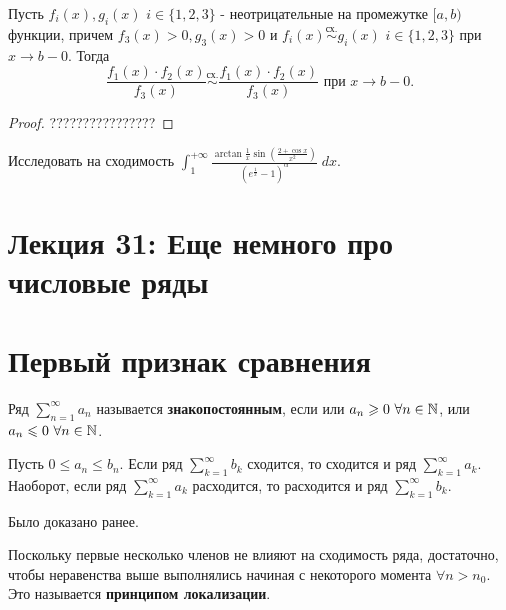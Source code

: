 	\begin{sentence}
		Пусть $f_i(x), g_i(x)$ $i \in \{1, 2, 3\}$ - неотрицательные на
		промежутке $[a, b)$ функции, причем $f_3(x) > 0, g_3(x) > 0$ и
		$f_i(x) \overset{\text{сх.}}{\sim} g_i(x)$ $i \in \{1, 2, 3\}$ при $x \rightarrow b - 0$. Тогда
		\[ \frac{f_1(x) \cdot f_2(x)}{f_3(x)} \overset{\text{сх.}}{\sim} \frac{f_1(x) \cdot f_2(x)}{f_3(x)} \text{ при } x \rightarrow b - 0.\]
	\end{sentence}
	
	\begin{proof}
		????????????????
	\end{proof}
	
	\begin{example}
		Исследовать на сходимость $\displaystyle \int_1^{+\infty} \frac{\arctan{\frac{1}{x}}\sin{(\frac{2 + \cos{x}}{x^2})}}{(e^{\frac{1}{x}} - 1)^{\alpha}} \; dx$.
	\end{example}
	
	\section*{Лекция 31: Еще немного про числовые ряды}

	\section{Первый признак сравнения}
	
	\begin{definition}
		Ряд $\sum_{n = 1}^{\infty} a_n$ называется \textbf{знакопостоянным}, если или
		$a_n \geqslant 0 \text{ } \forall n \in \mathbb N$, или $a_n \leqslant 0 \text{ } \forall n \in \mathbb N$.
	\end{definition}
	
	\begin{sentence}
		Пусть $0 \leqslant a_n \leqslant b_n$. Если ряд $\displaystyle \sum_{k = 1}^{\infty} b_k$ сходится, то сходится и ряд $\displaystyle \sum_{k = 1}^{\infty} a_k$. Наоборот, если ряд $\displaystyle \sum_{k = 1}^{\infty} a_k$ расходится, то расходится и ряд $\displaystyle \sum_{k = 1}^{\infty} b_k$.
	\end{sentence}
	
	Было доказано ранее.
	
	\begin{mention}
		Поскольку первые несколько членов не влияют на сходимость ряда, достаточно, чтобы неравенства выше выполнялись начиная с некоторого момента $\forall n > n_0$. Это называется \textbf{принципом локализации}.
	\end{mention}
	
